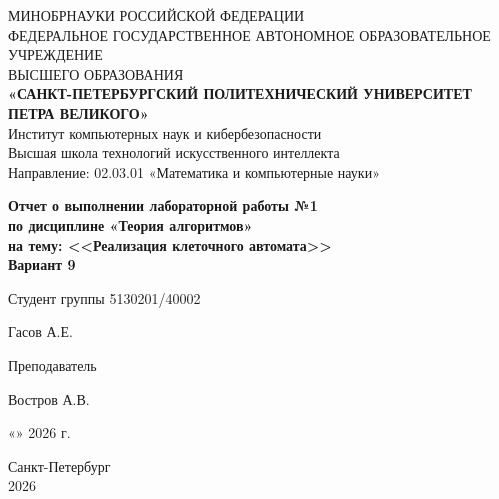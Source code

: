 \thispagestyle{empty}
\begin{center}
{\large 
МИНОБРНАУКИ РОССИЙСКОЙ ФЕДЕРАЦИИ \\ФЕДЕРАЛЬНОЕ ГОСУДАРСТВЕННОЕ  
АВТОНОМНОЕ ОБРАЗОВАТЕЛЬНОЕ УЧРЕЖДЕНИЕ \\ ВЫСШЕГО ОБРАЗОВАНИЯ \\ \vspace{7pt} \textbf{«САНКТ-ПЕТЕРБУРГСКИЙ ПОЛИТЕХНИЧЕСКИЙ УНИВЕРСИТЕТ ПЕТРА ВЕЛИКОГО»}\\ \vspace{7pt} Институт компьютерных наук и кибербезопасности\\ \vspace{4pt} Высшая школа технологий искусственного интеллекта\\ \vspace{4pt} Направление: 02.03.01 «Математика и компьютерные науки»

\vspace{90pt}
\textbf{Отчет о выполнении лабораторной работы №1}  \\ \vspace{6pt} \textbf{по дисциплине «Теория алгоритмов»} \\ \vspace{6pt} \textbf{на тему: <<Реализация клеточного автомата>>} \\\vspace{6pt}  \textbf{Вариант 9}
}
\end{center}

\vspace{100pt}
\noindent Студент группы 5130201/40002 \vspace{-25pt} \begin{flushright} \underline{\hspace{4cm}} Гасов А.Е. \;\;\;
\end{flushright} \par


\noindent Преподаватель\vspace{-25pt}\begin{flushright} \underline{\hspace{4cm}} Востров А.В.  \end{flushright} 

\vspace{70pt}
\begin{flushright}
    «\underline{\hspace{0.6cm}}» \underline{\hspace{2.5cm}} 2026 г.
\end{flushright}

\vspace{60pt}
\begin{center}
Санкт-Петербург \\ 2026
\end{center}

\newpage
